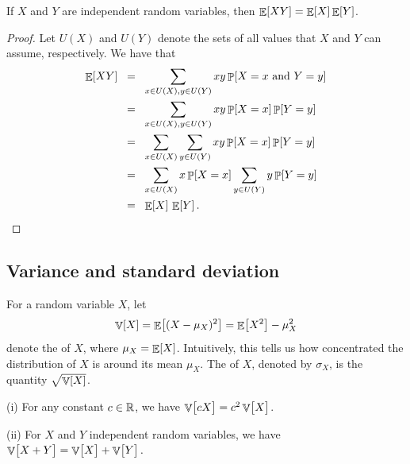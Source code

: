 \begin{lemma}
    If $X$ and $Y$ are independent random variables, then
    $\mathop{\mathbb{E}}\!\left[ {X Y} \right] = \mathop{\mathbb{E}}\!\left[ {X} \right]\mathop{\mathbb{E}}\!\left[ {Y} \right]$.
\end{lemma}
\begin{proof}
    Let $U(X)$ and $U(Y)$ denote the sets of all values that $X$ and $Y$
    can assume, respectively. We have that
    \begin{align*}
      \Ex{X Y}
      &\EQ%
      \sum_{x \in U(X), y \in U(Y)} xy \Prob{ X = x \text{ and } Y = y}        
      \\&
      \EQ%
        \sum_{x \in U(X), y \in U(Y)} xy \Prob{ X = x} \Prob{ Y = y}        
      \\&%
      \EQ%
      \sum_{x \in U(X)} \sum_{y \in U(Y)} xy \Prob{ X = x} \Prob{ Y = y}        
      \\&
      \EQ%
      \sum_{x \in U(X)} x \Prob{X=x} \sum_{y \in U(Y)} y  \Prob{ Y =
      y}
      \\&
      \EQ%
      \Ex{X} \, \Ex{Y}.
    \end{align*}
\end{proof}



\subsection{Variance and standard deviation}


\begin{defn}
    For a random variable
    $X$, let
    \begin{equation*}
        \mathop{\mathbb{V}}\!\left[ { X} \right] = \mathop{\mathbb{E}}\!\left[ { (X -\mu_X)^2 } \right] = \mathop{\mathbb{E}}\!\left[ {X^2} \right] - \mu_X^2
    \end{equation*}
    denote the  of $X$, where $\mu_X = \mathop{\mathbb{E}}\!\left[ {
       X} \right]$. Intuitively, this tells us how concentrated the distribution
    of $X$ is around its mean $\mu_X$.  The  of
    $X$, denoted by $\sigma_X$, is the quantity $\sqrt{\mathop{\mathbb{V}}\!\left[ { X} \right]}$.
\end{defn}

\begin{observation}
    (i) For any constant $c  \in \mathbb{R}$, we have
    $\mathop{\mathbb{V}}\!\left[ { \bigl. c X} \right] = c^2 \mathop{\mathbb{V}}\!\left[ {\bigl.  X} \right]$.
    
    (ii) For $X$ and $Y$ independent random variables, we have
    \begin{math}
        \Var{\bigl. X + Y }%
        =%
        \Var{\bigl. X } + \Var{ \bigl. Y }.
    \end{math}
\end{observation}

